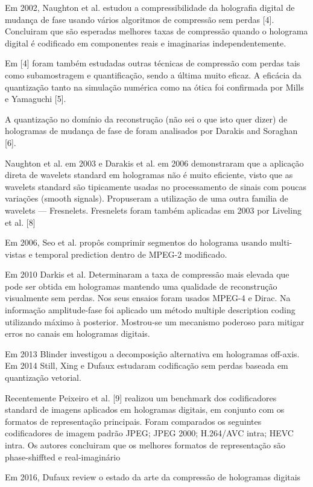 Em 2002, Naughton et al. estudou a compressibilidade da holografia digital de mudança de fase usando vários algoritmos de compressão sem perdas [4]. Concluiram que são esperadas melhores taxas de compressão quando o holograma digital é codificado em componentes reais e imaginarias independentemente.

Em [4] foram também estudadas outras técnicas de compressão com perdas tais como subamostragem e quantificação, sendo a última muito eficaz. A eficácia da quantização tanto na simulação numérica como na ótica foi confirmada por Mills e Yamaguchi [5].

A quantização no domínio da reconstrução (não sei o que isto quer dizer) de hologramas de mudança de fase de foram analisados por Darakis and Soraghan [6].

Naughton et al. em 2003 e Darakis et al. em 2006 demonstraram que a aplicação direta de wavelets standard em hologramas não é muito eficiente, visto que as wavelets standard são tipicamente usadas no processamento de sinais com poucas variações (smooth signals). Propuseram a utilização de uma outra familia de wavelets — Fresnelets. Fresnelets foram também aplicadas em 2003 por Liveling et al. [8]

Em 2006, Seo et al. propôs comprimir segmentos do holograma usando multi-vistas e temporal prediction dentro de MPEG-2 modificado.

Em 2010 Darkis et al. Determinaram a taxa de compressão mais elevada que pode ser obtida em hologramas mantendo uma qualidade de reconstrução visualmente sem perdas. Nos seus ensaios foram usados MPEG-4 e Dirac. Na informação amplitude-fase foi aplicado um método multiple description coding utilizando máximo à posterior. Mostrou-se um mecanismo poderoso para mitigar erros no canais em hologramas digitais.

Em 2013 Blinder investigou a decomposição alternativa em hologramas off-axis.
Em 2014 Still, Xing e Dufaux estudaram codificação sem perdas baseada em quantização vetorial. 

Recentemente Peixeiro et al. [9] realizou um benchmark dos codificadores standard de imagens aplicados em hologramas digitais, em conjunto com os formatos de representação principais. Foram comparados os seguintes codificadores de imagem padrão
  JPEG;
  JPEG 2000;
  H.264/AVC intra;
  HEVC intra.
Os autores concluiram que os melhores formatos de representação são phase-shiffted e real-imaginário

Em 2016, Dufaux review o estado da arte da compressão de hologramas digitais

